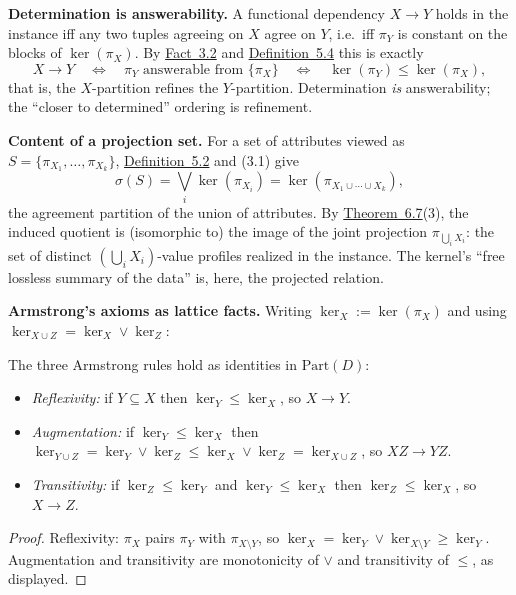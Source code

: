 \textbf{Determination is answerability.} A functional dependency \(X\to Y\) holds in the instance iff any two tuples agreeing on \(X\) agree on \(Y\), i.e.~iff \(\pi_Y\) is constant on the blocks of \(\ker(\pi_X)\). By \hyperlink{stmt:3.2}{Fact~3.2} and \hyperlink{stmt:5.4}{Definition~5.4} this is exactly
\[
X\to Y \quad\Longleftrightarrow\quad \pi_Y \text{ answerable from } \{\pi_X\}
\quad\Longleftrightarrow\quad \ker(\pi_Y)\le\ker(\pi_X),
\]
that is, the \(X\)-partition refines the \(Y\)-partition. Determination \emph{is} answerability; the ``closer to determined'' ordering is refinement.

\textbf{Content of a projection set.} For a set of attributes viewed as \(S=\{\pi_{X_1},\dots,\pi_{X_k}\}\), \hyperlink{stmt:5.2}{Definition~5.2} and (3.1) give
\[
\sigma(S)=\bigvee_i \ker(\pi_{X_i})=\ker(\pi_{X_1\cup\cdots\cup X_k}),
\]
the agreement partition of the union of attributes. By \hyperlink{stmt:6.7}{Theorem~6.7}(3), the induced quotient is (isomorphic to) the image of the joint projection \(\pi_{\bigcup_i X_i}\): the set of distinct \((\bigcup_i X_i)\)-value profiles realized in the instance. The kernel's ``free lossless summary of the data'' is, here, the projected relation.

\textbf{Armstrong's axioms as lattice facts.} Writing \(\ker_X:=\ker(\pi_X)\) and using \(\ker_{X\cup Z}=\ker_X\vee\ker_Z\):

\begin{thmplain}

The three Armstrong rules hold as identities in \(\mathrm{Part}(D)\):

\begin{itemize}
\tightlist
\item
  \emph{Reflexivity:} if \(Y\subseteq X\) then \(\ker_Y\le\ker_X\), so \(X\to Y\).
\item
  \emph{Augmentation:} if \(\ker_Y\le\ker_X\) then \(\ker_{Y\cup Z}=\ker_Y\vee\ker_Z\le\ker_X\vee\ker_Z=\ker_{X\cup Z}\), so \(XZ\to YZ\).
\item
  \emph{Transitivity:} if \(\ker_Z\le\ker_Y\) and \(\ker_Y\le\ker_X\) then \(\ker_Z\le\ker_X\), so \(X\to Z\).
\end{itemize}
\end{thmplain}

\begin{proof}

Reflexivity: \(\pi_X\) pairs \(\pi_Y\) with \(\pi_{X\setminus Y}\), so \(\ker_X=\ker_Y\vee\ker_{X\setminus Y}\ge\ker_Y\). Augmentation and transitivity are monotonicity of \(\vee\) and transitivity of \(\le\), as displayed.
\end{proof}

